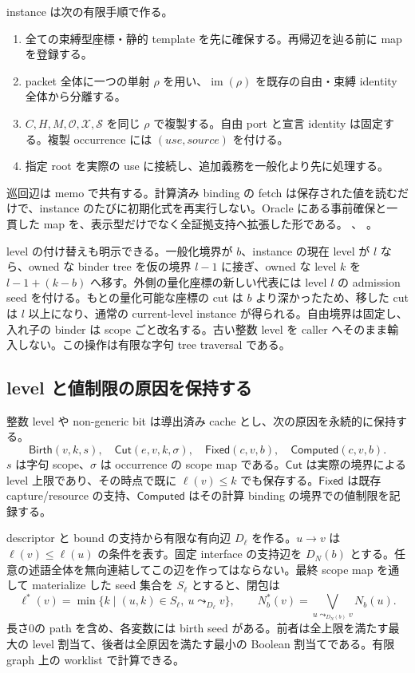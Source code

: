 \documentclass[11pt,a4paper]{article}
\theoremstyle{remark}
\newcommand{\src}[2]{\href{https://github.com/momota1029/yulang/blob/a58eefc31e22141574b6f20c6a5748151c6d79f1/#1}{\detokenize{#2}}}
\begin{document}
instance は次の有限手順で作る。
\begin{enumerate}
\item 全ての束縛型座標・静的 template を先に確保する。再帰辺を辿る前に map を登録する。
\item packet 全体に一つの単射 $\rho$ を用い、$\operatorname{im}(\rho)$ を既存の自由・束縛 identity 全体から分離する。
\item $C,H,M,\mathcal O,\mathcal X,\mathcal S$ を同じ $\rho$ で複製する。自由 port と宣言 identity は固定する。複製 occurrence には $(use,source)$ を付ける。
\item 指定 root を実際の use に接続し、追加義務を一般化より先に処理する。
\end{enumerate}
巡回辺は memo で共有する。計算済み binding の fetch は保存された値を読むだけで、instance のたびに初期化式を再実行しない。Oracle にある事前確保と一貫した map を、表示型だけでなく全証拠支持へ拡張した形である。
\src{crates/infer/src/instantiate.rs\#L620-L648}{instance の事前確保}、
\src{crates/infer/src/instantiate.rs\#L732-L785}{clone map と root POP}。

level の付け替えも明示できる。一般化境界が $b$、instance の現在 level が $l$ なら、owned な binder tree を仮の境界 $l-1$ に接ぎ、owned な level $k$ を $l-1+(k-b)$ へ移す。外側の量化座標の新しい代表には level $l$ の admission seed を付ける。もとの量化可能な座標の cut は $b$ より深かったため、移した cut は $l$ 以上になり、通常の current-level instance が得られる。自由境界は固定し、入れ子の binder は scope ごと改名する。古い整数 level を caller へそのまま輸入しない。この操作は有限な字句 tree traversal である。

\subsection{level と値制限の原因を保持する}

整数 level や non-generic bit は導出済み cache とし、次の原因を永続的に保持する。
\[
 \mathsf{Birth}(v,k,s),\quad
 \mathsf{Cut}(e,v,k,\sigma),\quad
 \mathsf{Fixed}(c,v,b),\quad
 \mathsf{Computed}(c,v,b).
\]
$s$ は字句 scope、$\sigma$ は occurrence の scope map である。$\mathsf{Cut}$ は実際の境界による level 上限であり、その時点で既に $\ell(v)\leq k$ でも保存する。$\mathsf{Fixed}$ は既存 capture/resource の支持、$\mathsf{Computed}$ はその計算 binding の境界での値制限を記録する。

descriptor と bound の支持から有限な有向辺 $D_\ell$ を作る。$u\to v$ は $\ell(v)\leq\ell(u)$ の条件を表す。固定 interface の支持辺を $D_N(b)$ とする。任意の述語全体を無向連結してこの辺を作ってはならない。最終 scope map を通して materialize した seed 集合を $S_\ell$ とすると、閉包は
\[
 \ell^*(v)=\min\{k\mid (u,k)\in S_\ell,\ u\leadsto_{D_\ell}v\},
 \qquad
 N_b^*(v)=\bigvee_{u\leadsto_{D_N(b)}v}N_b(u).
\]
長さ0の path を含め、各変数には birth seed がある。前者は全上限を満たす最大の level 割当て、後者は全原因を満たす最小の Boolean 割当てである。有限 graph 上の worklist で計算できる。
\end{document}
